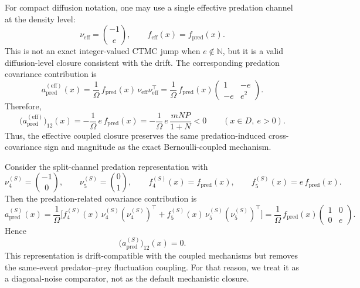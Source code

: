 \documentclass[pdflatex,sn-mathphys-ay]{sn-jnl}
\theoremstyle{thmstyleone}
\theoremstyle{definition}
\theoremstyle{remark}
\begin{document}
For compact diffusion notation, one may use a single effective predation channel at the density level:
\begin{equation}
\label{eq:nu_eff_paperA}
\nu_{\mathrm{eff}}=\binom{-1}{e},
\qquad
f_{\mathrm{eff}}(x)=f_{\mathrm{pred}}(x).
\end{equation}
This is not an exact integer-valued CTMC jump when \(e\notin\mathbb N\), but it is a valid diffusion-level closure consistent with the drift. The corresponding predation covariance contribution is
\begin{equation}
\label{eq:apred_eff_paperA}
a_{\mathrm{pred}}^{(\mathrm{eff})}(x)
=
\frac{1}{\Omega}\,f_{\mathrm{pred}}(x)\,\nu_{\mathrm{eff}}\nu_{\mathrm{eff}}^\top
=
\frac{1}{\Omega}\,f_{\mathrm{pred}}(x)
\begin{pmatrix}
1 & -e\\
-e & e^2
\end{pmatrix}.
\end{equation}
Therefore,
\begin{equation}
\label{eq:cross_eff_negative_paperA}
\bigl(a_{\mathrm{pred}}^{(\mathrm{eff})}\bigr)_{12}(x)
=
-\frac{1}{\Omega}\,e\,f_{\mathrm{pred}}(x)
=
-\frac{1}{\Omega}\,e\,\frac{mNP}{1+N}<0
\qquad (x\in D,\ e>0).
\end{equation}
Thus, the effective coupled closure preserves the same predation-induced cross-covariance sign and magnitude as the exact Bernoulli-coupled mechanism.

Consider the split-channel predation representation with
\[
\nu_4^{(S)}=\binom{-1}{0},
\qquad
\nu_5^{(S)}=\binom{0}{1},
\qquad
f_4^{(S)}(x)=f_{\mathrm{pred}}(x),
\qquad
f_5^{(S)}(x)=e\,f_{\mathrm{pred}}(x).
\]
Then the predation-related covariance contribution is
\begin{equation}
\label{eq:apred_split_paperA}
a_{\mathrm{pred}}^{(S)}(x)
=
\frac{1}{\Omega}\Big[
f_4^{(S)}(x)\,\nu_4^{(S)}(\nu_4^{(S)})^\top
+
f_5^{(S)}(x)\,\nu_5^{(S)}(\nu_5^{(S)})^\top
\Big]
=
\frac{1}{\Omega}\,f_{\mathrm{pred}}(x)
\begin{pmatrix}
1 & 0\\
0 & e
\end{pmatrix}.
\end{equation}
Hence
\begin{equation}
\label{eq:cross_split_zero_paperA}
\bigl(a_{\mathrm{pred}}^{(S)}\bigr)_{12}(x)=0.
\end{equation}
This representation is drift-compatible with the coupled mechanisms but removes the same-event predator--prey fluctuation coupling. For that reason, we treat it as a diagonal-noise comparator, not as the default mechanistic closure.
\end{document}
